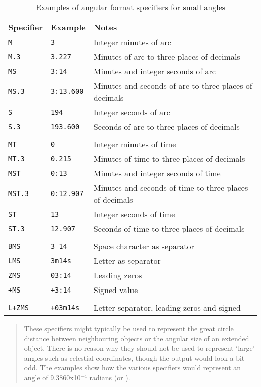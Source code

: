 \begin{table}[htbp]

\begin{center}
\begin{tabular}{lll}
Specifier   & Example        & Notes          \\ \hline
{\tt M}     & {\tt 3}        & Integer minutes of arc \\
{\tt M.3}   & {\tt 3.227}    & Minutes of arc to three places of decimals \\
{\tt MS}    & {\tt 3:14}     & Minutes and integer seconds of arc \\
{\tt MS.3}  & {\tt 3:13.600} & Minutes and seconds of arc to three places of decimals \\
{\tt S}     & {\tt 194}      & Integer seconds of arc \\
{\tt S.3}   & {\tt 193.600}  & Seconds of arc to three places of decimals \\
            &                & \\
{\tt MT}    & {\tt 0}        & Integer minutes of time \\
{\tt MT.3}  & {\tt 0.215}    & Minutes of time to three places of decimals \\
{\tt MST}   & {\tt 0:13}     & Minutes and integer seconds of time\\
{\tt MST.3} & {\tt 0:12.907} & Minutes and seconds of time to three places of decimals \\
{\tt ST}    & {\tt 13}       & Integer seconds of time \\
{\tt ST.3}  & {\tt 12.907}   & Seconds of time to three places of decimals \\
            &                & \\
{\tt BMS}   & {\tt 3 14}     & Space character as separator \\
{\tt LMS}   & {\tt 3m14s}    & Letter as separator \\
{\tt ZMS}   & {\tt 03:14}    & Leading zeros \\
{\tt +MS}   & {\tt +3:14}    & Signed value \\
            &                & \\
{\tt L+ZMS} & {\tt +03m14s}  & Letter separator, leading zeros and signed \\
\end{tabular}

\begin{quote}
These specifiers might typically be used to represent the great circle
distance between neighbouring objects or the angular size of an extended
object.  There is no reason why they should not be used to represent
`large' angles such as celestial coordinates, though the output would
look a bit odd.  The examples show how the various specifiers would
represent an angle of 9.3860x10$^{-4}$ radians (or ).
\end{quote}

\caption{\label{SMALL_EXAM}Examples of angular format specifiers for
small angles}
\end{center}

\end{table}

